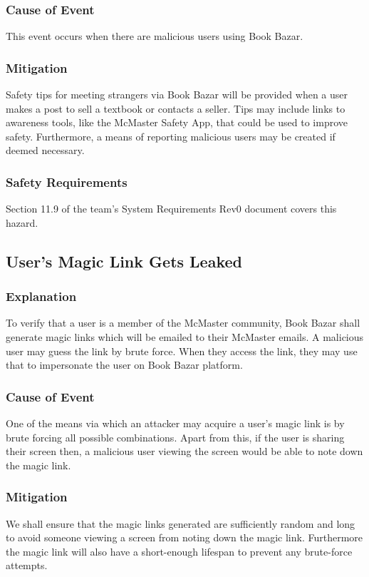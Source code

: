 \documentclass[fullpage]{article}
\begin{document}
\subsubsection*{Cause of Event}
This event occurs when there are malicious users using Book Bazar.

\subsubsection*{Mitigation}
Safety tips for meeting strangers via Book Bazar will be provided when a user makes a post to sell a textbook or contacts a seller. Tips may include links to awareness tools, like the McMaster Safety App, that could be used to improve safety. Furthermore, a means of reporting malicious users may be created if deemed necessary.

\subsubsection*{Safety Requirements}
Section 11.9 of the team's System Requirements Rev0 document covers this hazard.

\subsection{User's Magic Link Gets Leaked}


\subsubsection*{Explanation}
To verify that a user is a member of the McMaster community, Book Bazar shall generate magic links which will be emailed to their McMaster emails. A malicious user may guess the link by brute force. When they access the link, they may use that to impersonate the user on Book Bazar platform. 
\subsubsection*{Cause of Event}
One of the means via which an attacker may acquire a user's magic link is by brute forcing all possible combinations. Apart from this, if the user is sharing their screen then, a malicious user viewing the screen would be able to note down the magic link.

\subsubsection*{Mitigation}
We shall ensure that the magic links generated are sufficiently random and long to avoid someone viewing a screen from noting down the magic link. Furthermore the magic link will also have a short-enough lifespan to prevent any brute-force attempts.
\end{document}
